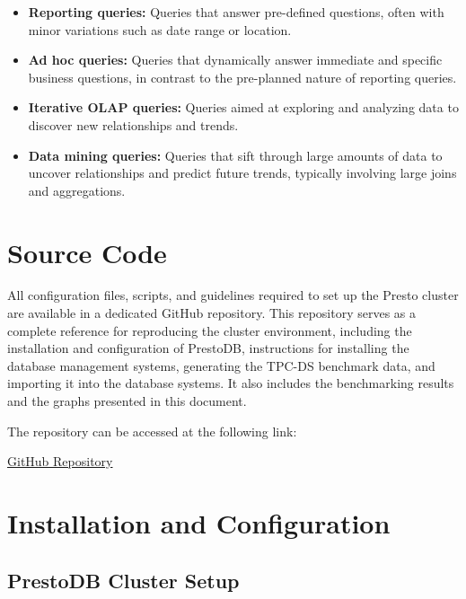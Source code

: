 \documentclass[conference]{IEEEtran}
\begin{document}
\begin{itemize}
    \item \textbf{Reporting queries:} Queries that answer pre-defined questions, often with minor variations such as date range or location.
    \item \textbf{Ad hoc queries:} Queries that dynamically answer immediate and specific business questions, in contrast to the pre-planned nature of reporting queries.
    \item \textbf{Iterative OLAP queries:} Queries aimed at exploring and analyzing data to discover new relationships and trends.
    \item \textbf{Data mining queries:} Queries that sift through large amounts of data to uncover relationships and predict future trends, typically involving large joins and aggregations. \cite{b5}
\end{itemize}

\section{Source Code}\label{source_code}

All configuration files, scripts, and guidelines required to set up the Presto cluster are available in a dedicated GitHub repository. This repository serves as a complete reference for reproducing the cluster environment, including the installation and configuration of PrestoDB, instructions for installing the database management systems, generating the TPC-DS benchmark data, and importing it into the database systems. It also includes the benchmarking results and the graphs presented in this document.

The repository can be accessed at the following link:

\begin{center}
    \href{https://github.com/mpantelakis/ntua-information-systems}{GitHub Repository}
\end{center}


\section{Installation and Configuration}

\subsection{PrestoDB Cluster Setup}
\end{document}

